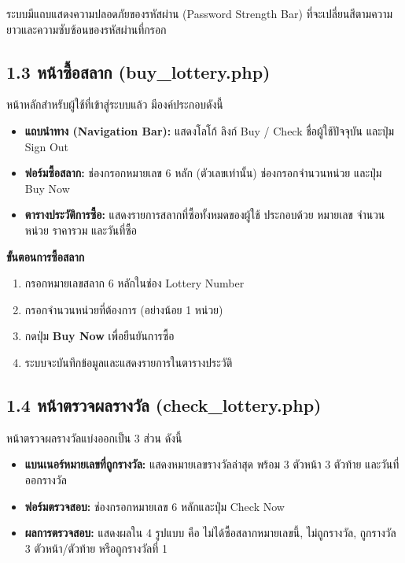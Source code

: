 \documentclass[a4paper,12pt]{article}
\begin{document}
ระบบมีแถบแสดงความปลอดภัยของรหัสผ่าน (Password Strength Bar) ที่จะเปลี่ยนสีตามความยาวและความซับซ้อนของรหัสผ่านที่กรอก

\subsection*{1.3 หน้าซื้อสลาก (buy\_lottery.php)}

หน้าหลักสำหรับผู้ใช้ที่เข้าสู่ระบบแล้ว มีองค์ประกอบดังนี้

\begin{itemize}[leftmargin=1.5cm, topsep=2pt, itemsep=1pt]
  \item \textbf{แถบนำทาง (Navigation Bar):} แสดงโลโก้ ลิงก์ Buy / Check ชื่อผู้ใช้ปัจจุบัน และปุ่ม Sign Out
  \item \textbf{ฟอร์มซื้อสลาก:} ช่องกรอกหมายเลข 6 หลัก (ตัวเลขเท่านั้น) ช่องกรอกจำนวนหน่วย และปุ่ม Buy Now
  \item \textbf{ตารางประวัติการซื้อ:} แสดงรายการสลากที่ซื้อทั้งหมดของผู้ใช้ ประกอบด้วย หมายเลข จำนวนหน่วย ราคารวม และวันที่ซื้อ
\end{itemize}

\newpage

\noindent\textbf{ขั้นตอนการซื้อสลาก}
\begin{enumerate}[leftmargin=2cm, label=\arabic*., topsep=2pt, itemsep=1pt]
  \item กรอกหมายเลขสลาก 6 หลักในช่อง Lottery Number
  \item กรอกจำนวนหน่วยที่ต้องการ (อย่างน้อย 1 หน่วย)
  \item กดปุ่ม \textbf{Buy Now} เพื่อยืนยันการซื้อ
  \item ระบบจะบันทึกข้อมูลและแสดงรายการในตารางประวัติ
\end{enumerate}

\subsection*{1.4 หน้าตรวจผลรางวัล (check\_lottery.php)}

หน้าตรวจผลรางวัลแบ่งออกเป็น 3 ส่วน ดังนี้

\begin{itemize}[leftmargin=1.5cm, topsep=2pt, itemsep=1pt]
  \item \textbf{แบนเนอร์หมายเลขที่ถูกรางวัล:} แสดงหมายเลขรางวัลล่าสุด พร้อม 3 ตัวหน้า 3 ตัวท้าย และวันที่ออกรางวัล
  \item \textbf{ฟอร์มตรวจสอบ:} ช่องกรอกหมายเลข 6 หลักและปุ่ม Check Now
  \item \textbf{ผลการตรวจสอบ:} แสดงผลใน 4 รูปแบบ คือ ไม่ได้ซื้อสลากหมายเลขนี้, ไม่ถูกรางวัล, ถูกรางวัล 3 ตัวหน้า/ตัวท้าย หรือถูกรางวัลที่ 1
\end{itemize}
\end{document}
